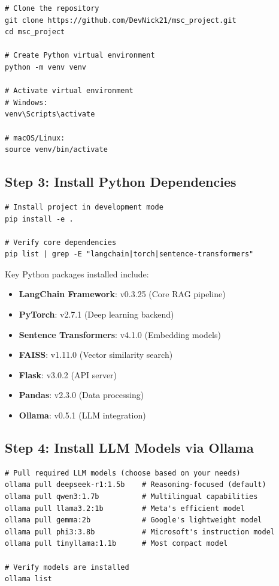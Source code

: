 \begin{verbatim}
# Clone the repository
git clone https://github.com/DevNick21/msc_project.git
cd msc_project

# Create Python virtual environment
python -m venv venv

# Activate virtual environment
# Windows:
venv\Scripts\activate

# macOS/Linux:
source venv/bin/activate
\end{verbatim}

\subsection{Step 3: Install Python Dependencies}

\begin{verbatim}
# Install project in development mode
pip install -e .

# Verify core dependencies
pip list | grep -E "langchain|torch|sentence-transformers"
\end{verbatim}

Key Python packages installed include:
\begin{itemize}
    \item \textbf{LangChain Framework}: v0.3.25 (Core RAG pipeline)
    \item \textbf{PyTorch}: v2.7.1 (Deep learning backend)
    \item \textbf{Sentence Transformers}: v4.1.0 (Embedding models)
    \item \textbf{FAISS}: v1.11.0 (Vector similarity search)
    \item \textbf{Flask}: v3.0.2 (API server)
    \item \textbf{Pandas}: v2.3.0 (Data processing)
    \item \textbf{Ollama}: v0.5.1 (LLM integration)
\end{itemize}

\subsection{Step 4: Install LLM Models via Ollama}

\begin{verbatim}
# Pull required LLM models (choose based on your needs)
ollama pull deepseek-r1:1.5b    # Reasoning-focused (default)
ollama pull qwen3:1.7b          # Multilingual capabilities
ollama pull llama3.2:1b         # Meta's efficient model
ollama pull gemma:2b            # Google's lightweight model
ollama pull phi3:3.8b           # Microsoft's instruction model
ollama pull tinyllama:1.1b      # Most compact model

# Verify models are installed
ollama list
\end{verbatim}

